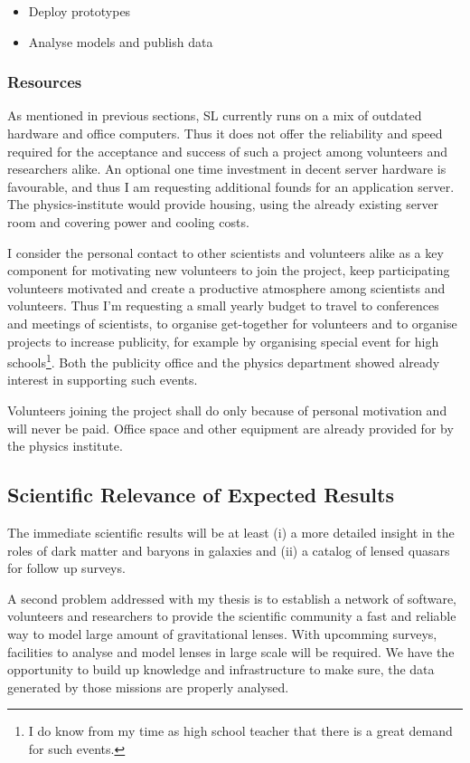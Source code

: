 \documentclass[11pt]{article}
\begin{document}
\begin{itemize}
  \item Deploy prototypes
  \item Analyse models and publish data
\end{itemize}


\subsubsection{Resources}

As mentioned in previous sections, SL currently runs on a mix of outdated hardware and office computers.
Thus it does not offer the reliability and speed required for the acceptance and success of such a project among volunteers and researchers alike.
An optional one time investment in decent server hardware is favourable, and thus I am requesting additional founds for an application server.
The physics-institute would provide housing, using the already existing server room and covering power and cooling costs.

I consider the personal contact to other scientists and volunteers alike as a key component for motivating new volunteers to join the project, keep participating volunteers motivated and create a productive atmosphere among scientists and volunteers.
Thus I'm requesting a small yearly budget to travel to conferences and meetings of scientists, to organise get-together for volunteers and to organise projects to increase publicity, for example by organising special event for high schools\footnote{I do know from my time as high school teacher that there is a great demand for such events.}. Both the publicity office and the physics department showed already interest in supporting such events.

Volunteers joining the project shall do only because of personal motivation and will never be paid.
Office space and other equipment are already provided for by the physics institute.




\subsection{Scientific Relevance of Expected Results}

The immediate scientific results will be at least (i) a more detailed insight in the roles of dark matter and baryons in galaxies and (ii) a catalog of lensed quasars for follow up surveys.

A second problem addressed with my thesis is to establish a network of software, volunteers and researchers to provide the scientific community a fast and reliable way to model large amount of gravitational lenses.
With upcomming surveys, facilities to analyse and model lenses in large scale will be required.
We have the opportunity to build up knowledge and infrastructure to make sure, the data generated by those missions are properly analysed.


\newpage


\end{document}
